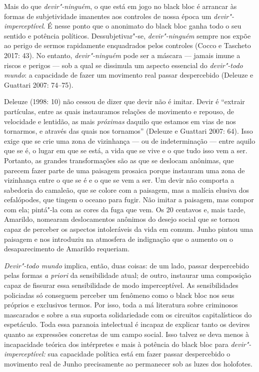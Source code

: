 Mais do que \emph{devir"-ninguém}, o que está em jogo no black bloc
é arrancar às formas de subjetividade imanentes aos controles de nossa
época um \emph{devir"-imperceptível}. É nesse ponto que o anonimato do
black bloc ganha todo o seu sentido e potência políticos.
Dessubjetivar"-se, \emph{devir"-ninguém} sempre nos expõe ao perigo de
sermos rapidamente enquadrados pelos controles (Cocco e Tascheto 2017:
43). No entanto, \emph{devir"-ninguém} pode ser a máscara --- jamais imune
a riscos e perigos --- sob a qual se dissimula um aspecto essencial do
\emph{devir"-todo mundo}: a capacidade de fazer um movimento real passar
despercebido (Deleuze e Guattari 2007: 74--75).

Deleuze (1998: 10) não cessou de dizer que devir não é imitar. Devir é
``extrair partículas, entre as quais instauramos relações de movimento e
repouso, de velocidade e lentidão, as mais\emph{ próximas }daquilo que
estamos em vias de nos tornarmos, e através das quais nos tornamos''
(Deleuze e Guattari 2007: 64). Isso exige que se crie uma zona de
vizinhança --- ou de indeterminação --- entre aquilo que se é, o lugar em
que se está, a vida que se vive e o que tudo isso vem a ser. Portanto,
as grandes transformações são as que se deslocam anônimas, que parecem
fazer parte de uma paisagem prosaica porque instauram uma zona de
vizinhança entre o que se é e o que se vem a ser. Um devir não comporta
a sabedoria do camaleão, que se colore com a paisagem, mas a malícia
elusiva dos cefalópodes, que tingem o oceano para fugir. Não imitar a
paisagem, mas compor com ela; pintá"-la com as cores da fuga que vem. Os
20 centavos e, mais tarde, Amarildo, nomearam deslocamentos anônimos do
desejo social que se tornou capaz de perceber os aspectos intoleráveis
da vida em comum. Junho pintou uma paisagem e nos introduziu na
atmosfera de indignação que o aumento ou o desaparecimento de Amarildo
requeriam.

\emph{Devir"-todo mundo} implica, então, duas coisas: de um lado, passar
despercebido pelas formas \emph{a priori} da sensibilidade atual; de
outro, instaurar uma composição capaz de fissurar essa sensibilidade de
modo imperceptível. As sensibilidades policiadas só conseguem perceber
um fenômeno como o black bloc nos seus próprios e exclusivos
termos. Por isso, toda a má literatura sobre criminosos mascarados e
sobre a sua suposta solidariedade com os circuitos capitalísticos do
espetáculo. Toda essa paranoia intelectual é incapaz de explicar tanto
os devires quanto as expressões concretas de um campo social. Isso
talvez se deva menos à incapacidade teórica dos intérpretes e mais à
potência do black bloc para \emph{devir"-imperceptível:} sua
capacidade política está em fazer passar despercebido o movimento real
de Junho precisamente ao permanecer sob as luzes dos holofotes.

